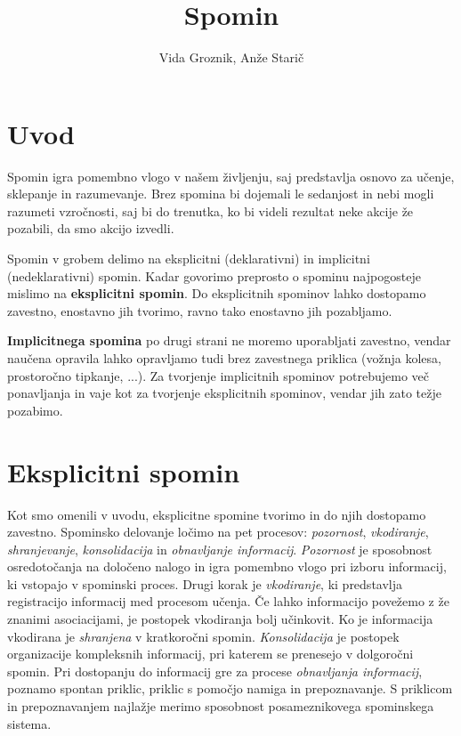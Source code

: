 \documentclass[10pt,a4paper]{article}
\author{Vida Groznik, Anže Starič}
\title{Spomin}
\begin{document}
\maketitle
\newpage

\section{Uvod}
Spomin igra pomembno vlogo v našem življenju, saj predstavlja osnovo za učenje, sklepanje in razumevanje. Brez spomina bi dojemali le sedanjost in nebi mogli razumeti vzročnosti, saj bi do trenutka, ko bi videli rezultat neke akcije že pozabili, da smo akcijo izvedli.

Spomin v grobem delimo na eksplicitni (deklarativni) in implicitni (nedeklarativni) spomin. Kadar govorimo preprosto o spominu najpogosteje mislimo na {\bf eksplicitni spomin}. Do eksplicitnih spominov lahko dostopamo zavestno, enostavno jih tvorimo, ravno tako enostavno jih pozabljamo.

{\bf Implicitnega spomina} po drugi strani ne moremo uporabljati zavestno, vendar naučena opravila lahko opravljamo tudi brez zavestnega priklica (vožnja kolesa, prostoročno tipkanje, ...). Za tvorjenje implicitnih spominov potrebujemo več ponavljanja in vaje kot za tvorjenje eksplicitnih spominov, vendar jih zato težje pozabimo.

\section{Eksplicitni spomin}
Kot smo omenili v uvodu, eksplicitne spomine tvorimo in do njih dostopamo zavestno. Spominsko delovanje ločimo na pet procesov: {\it pozornost}, {\it vkodiranje}, {\it shranjevanje}, {\it konsolidacija} in {\it obnavljanje informacij}. {\it Pozornost} je sposobnost osredotočanja na določeno nalogo in igra pomembno vlogo pri izboru informacij, ki vstopajo v spominski proces. Drugi korak je {\it vkodiranje}, ki predstavlja registracijo informacij med procesom učenja. Če lahko informacijo povežemo z že znanimi asociacijami, je postopek vkodiranja bolj učinkovit. Ko je informacija vkodirana je {\it shranjena} v kratkoročni spomin. {\it Konsolidacija} je postopek organizacije kompleksnih informacij, pri katerem se prenesejo v dolgoročni spomin. Pri dostopanju do informacij gre za procese {\it obnavljanja informacij}, poznamo spontan priklic, priklic s pomočjo namiga in prepoznavanje. S priklicom in prepoznavanjem najlažje merimo sposobnost posameznikovega spominskega sistema.
\end{document}

